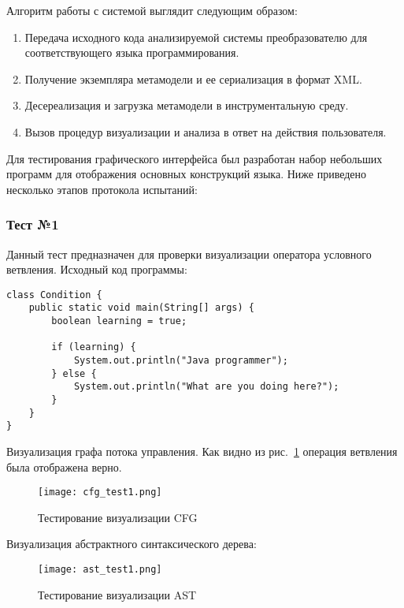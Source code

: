 Алгоритм работы с системой выглядит следующим образом:

\begin{enumerate}
    \item Передача исходного кода анализируемой системы преобразователю для
    соответствующего языка программирования.
    \item Получение экземпляра метамодели и ее сериализация в формат XML.
    \item Десереализация и загрузка метамодели в инструментальную среду.
    \item Вызов процедур визуализации и анализа в ответ на действия пользователя.
\end{enumerate}

Для тестирования графического интерфейса был разработан набор небольших программ
для отображения основных конструкций языка. Ниже приведено несколько этапов
протокола испытаний:

\subsubsection{Тест №1}

Данный тест предназначен для проверки визуализации оператора условного ветвления.
Исходный код программы:

\begin{lstlisting}
class Condition {
    public static void main(String[] args) {
        boolean learning = true;

        if (learning) {
            System.out.println("Java programmer");
        } else {
            System.out.println("What are you doing here?");
        }
    }
}
\end{lstlisting}

Визуализация графа потока управления. Как видно из рис.~\ref{fig:cfg_test1}
операция ветвления была отображена верно.

\newpage
\begin{figure}[h]
    \begin{center}
        \texttt{[image: cfg\_test1.png]}
    \end{center}
    \caption{Тестирование визуализации CFG}
    \label{fig:cfg_test1}
\end{figure}

Визуализация абстрактного синтаксического дерева:

\begin{figure}[h]
    \begin{center}
        \texttt{[image: ast\_test1.png]}
    \end{center}
    \caption{Тестирование визуализации AST}
    \label{fig:ast_test1}
\end{figure}

